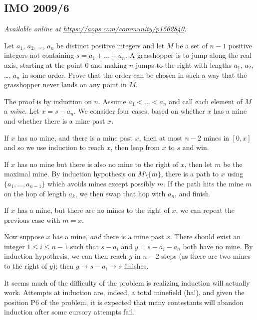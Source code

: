 \documentclass[11pt]{scrartcl}
\begin{document}
\subsection{IMO 2009/6}
\textsl{Available online at \url{https://aops.com/community/p1562840}.}
\begin{mdframed}[style=mdpurplebox,frametitle={Problem statement}]
Let $a_1$, $a_2$, \dots, $a_n$ be distinct positive integers and
let $M$ be a set of $n-1$ positive integers not containing $s = a_1 + \dots + a_n$.
A grasshopper is to jump along the real axis, starting at the point $0$ and
making $n$ jumps to the right with lengths $a_1$, $a_2$, \dots, $a_n$ in some order.
Prove that the order can be chosen in such a way that
the grasshopper never lands on any point in $M$.
\end{mdframed}
The proof is by induction on $n$.
Assume $a_1 < \dots < a_n$ and call each element of $M$ a \emph{mine}.
Let $x = s - a_n$.
We consider four cases, based on whether $x$ has a mine
and whether there is a mine past $x$.
\begin{itemize}
  \ii If $x$ has no mine, and there is a mine past $x$,
  then at most $n-2$ mines in $[0, x]$ and so we use induction to reach $x$,
  then leap from $x$ to $s$ and win.

  \ii If $x$ has no mine but there is also no mine to the right of $x$,
  then let $m$ be the maximal mine.
  By induction hypothesis on $M \setminus \{m\}$, there is a path to $x$
  using $\{a_1, \dots, a_{n-1}\}$ which avoids mines except possibly $m$.
  If the path hits the mine $m$ on the hop of length $a_k$,
  we then swap that hop with $a_n$, and finish.

  \ii If $x$ has a mine, but there are no mines to the right of $x$,
  we can repeat the previous case with $m = x$.

  \ii Now suppose $x$ has a mine, \emph{and} there is a mine past $x$.
  There should exist an integer $1 \le i \le n-1$
  such that $s-a_i$ and $y = s-a_i-a_n$ both have no mine.
  By induction hypothesis, we can then reach $y$ in $n-2$ steps
  (as there are two mines to the right of $y$); then $y \to s-a_i \to s$ finishes.
\end{itemize}

\begin{remark*}
  It seems much of the difficulty of the problem is
  realizing induction will actually work.
  Attempts at induction are, indeed, a total minefield (ha!),
  and given the position P6 of the problem,
  it is expected that many contestants will abandon
  induction after some cursory attempts fail.
\end{remark*}
\pagebreak
\end{document}
